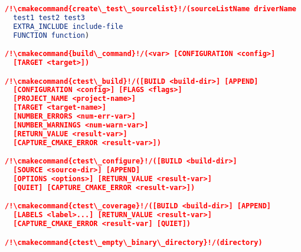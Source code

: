 \documentclass{article}
\newcommand{\cmakecommand}[1]{{\href{https://cmake.org/cmake/help/v3.20/command/#1.html}{#1}}}
\begin{document}
\begin{minipage}[t]{0.18\linewidth}
\begin{lstlisting}[language=CMake]
/!\cmakecommand{create\_test\_sourcelist}!/(sourceListName driverName
  test1 test2 test3
  EXTRA_INCLUDE include-file
  FUNCTION function)

/!\cmakecommand{build\_command}!/(<var> [CONFIGURATION <config>]
  [TARGET <target>])

/!\cmakecommand{ctest\_build}!/([BUILD <build-dir>] [APPEND]
  [CONFIGURATION <config>] [FLAGS <flags>]
  [PROJECT_NAME <project-name>]
  [TARGET <target-name>]
  [NUMBER_ERRORS <num-err-var>]
  [NUMBER_WARNINGS <num-warn-var>]
  [RETURN_VALUE <result-var>]
  [CAPTURE_CMAKE_ERROR <result-var>])

/!\cmakecommand{ctest\_configure}!/([BUILD <build-dir>]
  [SOURCE <source-dir>] [APPEND]
  [OPTIONS <options>] [RETURN_VALUE <result-var>]
  [QUIET] [CAPTURE_CMAKE_ERROR <result-var>])

/!\cmakecommand{ctest\_coverage}!/([BUILD <build-dir>] [APPEND]
  [LABELS <label>...] [RETURN_VALUE <result-var>]
  [CAPTURE_CMAKE_ERROR <result-var] [QUIET])

/!\cmakecommand{ctest\_empty\_binary\_directory}!/(directory)
\end{lstlisting}
\end{minipage}
\hfill\vline\hfill
\end{document}
